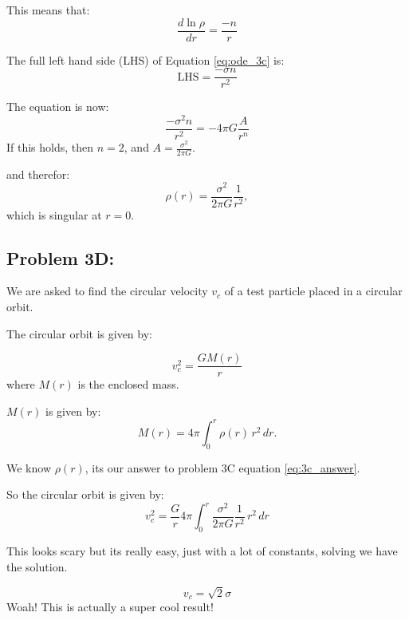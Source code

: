 This means that:
\begin{equation}
    \frac{d\ln{\rho}}{dr} = \frac{-n}{r}
\end{equation}

The full left hand side (LHS) of Equation \ref{eq:ode_3c} is:
\begin{equation}
    \mathrm{LHS} = \frac{-\sigma n}{r^2}
\end{equation}

The equation is now:
\begin{equation}
   \frac{-\sigma^2 n}{r^2} = -4\pi G \frac{A}{r^n}
\end{equation}
If this holds, then $n=2$, and $A= \frac{\sigma^2}{2\pi G}$.

and therefor:
\begin{equation} \label{eq:3c_answer}
    \boxed{\rho(r) = \frac{\sigma^2}{2\pi G} \frac{1}{r^2}},
\end{equation}
which is singular at $r=0$. 

\subsection*{Problem 3D:}
We are asked to find the circular velocity $v_c$ of a test particle placed in a circular orbit. 


The circular orbit is given by:

\begin{equation}
    v_c^2 = \frac{GM(r)}{r}
\end{equation}
where $M(r)$ is the enclosed mass. 

$M(r)$ is given by:
\begin{equation}
    M(r) = 4 \pi \int_0^r \rho(r) \, {r}^2 \, dr.
\end{equation}


We know $\rho(r)$, its our answer to problem 3C equation \ref{eq:3c_answer}. 

So the circular orbit is given by:
\begin{equation}
    v_c^2 = \frac{G}{r} 4 \pi \int_0^r \frac{\sigma^2}{2\pi G} \frac{1}{r^2} \, {r}^2 \, dr
\end{equation}

This looks scary but its really easy, just with a lot of constants, solving we have the solution. 

\begin{equation} \label{eq:v_c}
    \boxed{v_c = \sqrt{2}\sigma}
\end{equation}
Woah! This is actually a super cool result! 


